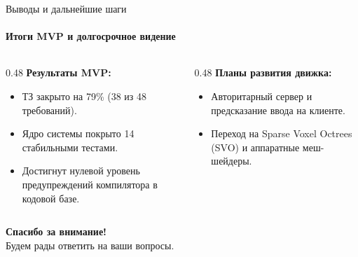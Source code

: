 \begin{frame}{Выводы и дальнейшие шаги}
  \framesubtitle{Итоги MVP и долгосрочное видение}
  \begin{columns}[T]
    \begin{column}{0.48\textwidth}
      \textbf{Результаты MVP:}
      \begin{itemize}
        \item ТЗ закрыто на 79\% (38 из 48 требований).
        \item Ядро системы покрыто 14 стабильными тестами.
        \item Достигнут нулевой уровень предупреждений компилятора в кодовой базе.
      \end{itemize}
    \end{column}
    \begin{column}{0.48\textwidth}
      \textbf{Планы развития движка:}
      \begin{itemize}
        \item {} Авторитарный сервер и предсказание ввода на клиенте.
        \item {} Переход на Sparse Voxel Octrees (SVO) и аппаратные меш-шейдеры.
      \end{itemize}
    \end{column}
  \end{columns}
  \vspace{1.5em}
  \begin{center}
    {\Large \textbf{Спасибо за внимание!}} \\[0.3em]
    {\small Будем рады ответить на ваши вопросы.}
  \end{center}
\end{frame}


